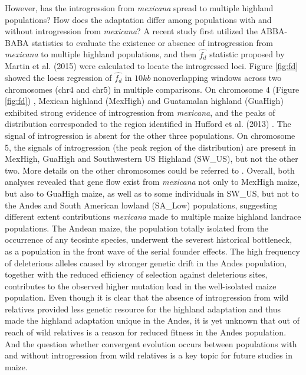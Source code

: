 \documentclass[11pt]{article}
\begin{document}
However, has the introgression from \emph{mexicana} spread to multiple highland populations? 
How does the adaptation differ among populations with and without introgression from \emph{mexicana}?
A recent study \cite{Wang2015manuscript} first utilized the ABBA-BABA statistics to evaluate the existence or absence of introgression from  \emph{mexicana} to multiple highland populations, and then $\hat{f_{d}}$ statistic proposed by Martin et al. (2015) \citep{martin2015} were calculated to locate the introgressed loci. 
Figure \ref{fig:fd} showed the loess regression of $\hat{f_{d}}$ in $10kb$ non\-overlapping windows across two chromosomes (chr4 and chr5) in multiple comparisons. 
On chromosome 4 (Figure \ref{fig:fd}) , Mexican highland (MexHigh) and Guatamalan highland (GuaHigh) exhibited strong evidence of introgression from \emph{mexicana}, and the peaks of distribution corresponded to the region identified in Hufford et al. (2013) \citep{hufford2013}. 
The signal of introgression is absent for the other three populations.
On chromosome 5, the signals of introgression (the peak region of the distribution) are present in MexHigh, GuaHigh and Southwestern US Highland (SW\_US), but not the other two.
More details on the other chromosomes could be referred to \cite{Wang2015manuscript}.
Overall, both analyses revealed that gene flow exist from \emph{mexicana} not only to MexHigh maize, but also to GuaHigh maize, as well as to some individuals in SW\_US, but not to the Andes and South American lowland (SA\_Low) populations, suggesting different extent contributions \emph{mexicana} made to multiple maize highland landrace populations. 
The Andean maize, the population totally isolated from the occurrence of any teosinte species, underwent the severest historical bottleneck, as a population in the front wave of the serial founder effects. 
The high frequency of deleterious alleles caused by stronger genetic drift in the Andes population, together with the reduced efficiency of selection against deleterious sites, contributes to the observed higher mutation load in the well-isolated maize population. 
Even though it is clear that the absence of introgression from wild relatives provided less genetic resource for the highland adaptation and thus made the highland adaptation unique in the Andes, it is yet unknown that out of reach of wild relatives is a reason for reduced fitness in the Andes population.
And the question whether convergent evolution occurs between populations with and without introgression from wild relatives is a key topic for future studies in maize.
\end{document}
